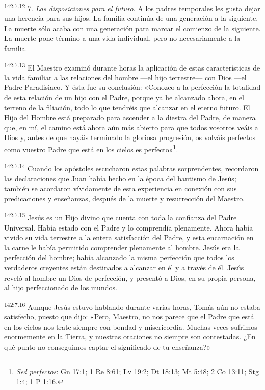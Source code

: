 \par 
\textsuperscript{142:7.12} 7. \textit{Las disposiciones para el futuro}. A los padres temporales les gusta dejar una herencia para sus hijos. La familia continúa de una generación a la siguiente. La muerte sólo acaba con una generación para marcar el comienzo de la siguiente. La muerte pone término a una vida individual, pero no necesariamente a la familia.

\par 
\textsuperscript{142:7.13} El Maestro examinó durante horas la aplicación de estas características de la vida familiar a las relaciones del hombre ---el hijo terrestre--- con Dios ---el Padre Paradisiaco. Y ésta fue su conclusión: «Conozco a la perfección la totalidad de esta relación de un hijo con el Padre, porque ya he alcanzado ahora, en el terreno de la filiación, todo lo que tendréis que alcanzar en el eterno futuro. El Hijo del Hombre está preparado para ascender a la diestra del Padre, de manera que, en mí, el camino está ahora aún más abierto para que todos vosotros veáis a Dios y, antes de que hayáis terminado la gloriosa progresión, os volváis perfectos como vuestro Padre que está en los cielos es perfecto»\footnote{\textit{Sed perfectos}: Gn 17:1; 1 Re 8:61; Lv 19:2; Dt 18:13; Mt 5:48; 2 Co 13:11; Stg 1:4; 1 P 1:16.}.

\par 
\textsuperscript{142:7.14} Cuando los apóstoles escucharon estas palabras sorprendentes, recordaron las declaraciones que Juan había hecho en la época del bautismo de Jesús; también se acordaron vívidamente de esta experiencia en conexión con sus predicaciones y enseñanzas, después de la muerte y resurrección del Maestro.

\par 
\textsuperscript{142:7.15} Jesús es un Hijo divino que cuenta con toda la confianza del Padre Universal. Había estado con el Padre y lo comprendía plenamente. Ahora había vivido su vida terrestre a la entera satisfacción del Padre, y esta encarnación en la carne le había permitido comprender plenamente al hombre. Jesús era la perfección del hombre; había alcanzado la misma perfección que todos los verdaderos creyentes están destinados a alcanzar en él y a través de él. Jesús reveló al hombre un Dios de perfección, y presentó a Dios, en su propia persona, al hijo perfeccionado de los mundos.

\par 
\textsuperscript{142:7.16} Aunque Jesús estuvo hablando durante varias horas, Tomás aún no estaba satisfecho, puesto que dijo: «Pero, Maestro, no nos parece que el Padre que está en los cielos nos trate siempre con bondad y misericordia. Muchas veces sufrimos enormemente en la Tierra, y nuestras oraciones no siempre son contestadas. ¿En qué punto no conseguimos captar el significado de tu enseñanza?»

